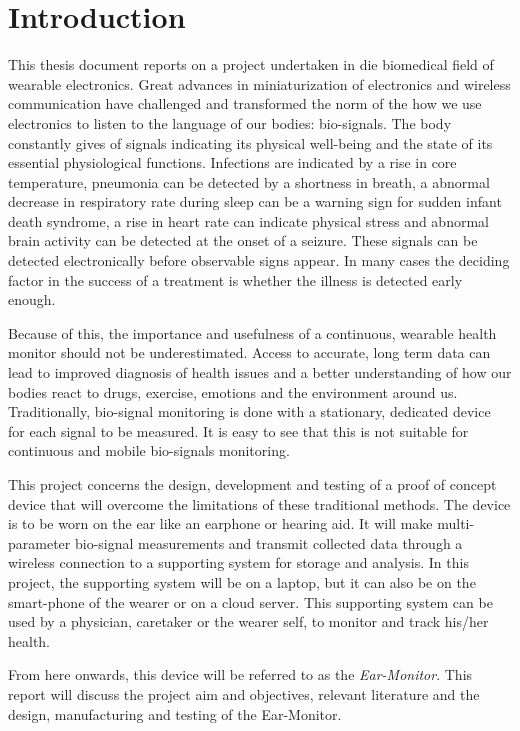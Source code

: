 \chapter{Introduction}
\label{chp:Intro}
This thesis document reports on a project undertaken in die biomedical field of wearable electronics. Great advances in miniaturization of electronics and wireless communication have challenged and transformed the norm of the how we use electronics to listen to the language of our bodies: bio-signals. The body constantly gives of signals indicating its physical well-being and the state of its essential physiological functions. Infections are indicated by a rise in core temperature, pneumonia can be detected by a shortness in breath, a abnormal decrease in respiratory rate during sleep can be a warning sign for sudden infant death syndrome, a rise in heart rate can indicate physical stress and abnormal brain activity can be detected at the onset of a seizure. These signals can be detected electronically before observable signs appear. In many cases the deciding factor in the success of a treatment is whether the illness is detected early enough.

\medskip

Because of this, the importance and usefulness of a continuous, wearable health monitor should not be underestimated. Access to accurate, long term data can lead to improved diagnosis of health issues and a better understanding of how our bodies react to drugs, exercise, emotions and the environment around us. Traditionally, bio-signal monitoring is done with a stationary, dedicated device for each signal to be measured. It is easy to see that this is not suitable for continuous and mobile bio-signals monitoring. 

\medskip

This project concerns the design, development and testing of a proof of concept device that will overcome the limitations of these traditional methods. The device is to be worn on the ear like an earphone or hearing aid. It will make multi-parameter bio-signal measurements and transmit collected data through a wireless connection to a supporting system for storage and analysis. In this project, the supporting system will be on a laptop, but it can also be on the smart-phone of the wearer or on a cloud server. This supporting system can be used by a physician, caretaker or the wearer self, to monitor and track his/her health.

\medskip

From here onwards, this device will be referred to as the \textit{Ear-Monitor}. This report will discuss the project aim and objectives, relevant literature and the design, manufacturing and testing of the Ear-Monitor.

